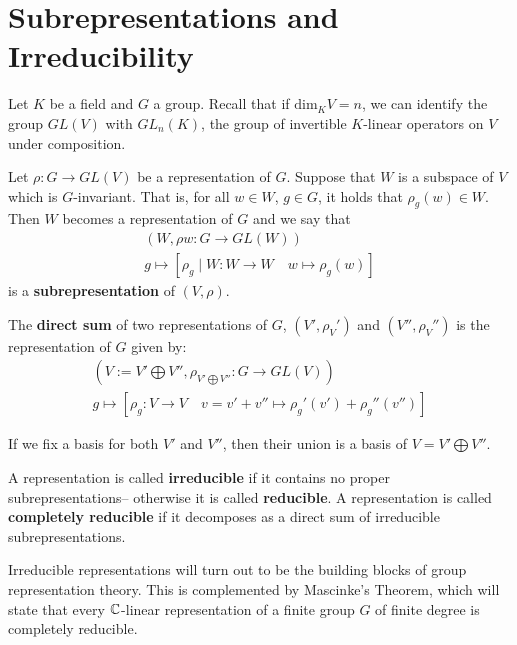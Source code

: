 \documentclass{memoir}
\begin{document}


\section{Subrepresentations and Irreducibility}
\label{sec:subrepresentations_and_irreducibility}

Let \(K\) be a field and \(G\) a group. Recall that if \(\textrm{dim}_KV = n\), we can identify the group \(GL(V)\) with \(GL_n(K)\), the group of invertible \(K \)-linear operators on \(V\) under composition.

\begin{defn}[Subrepresentations]
	Let \(\rho:G\to GL(V)\) be a representation of \(G\). Suppose that \(W\) is a subspace of \(V\) which is \(G\)-invariant. That is, for all \(w \in W\), \(g \in G\), it holds that  \(\rho_g(w)\in W\). Then \(W\) becomes a representation of \(G\) and we say that
	\begin{align*}
		(W,\rho w:G\to GL(W))\\
		g\mapsto \left[ \rho_g\mid W:W\to W \quad w \mapsto \rho_g(w) \right] 
	\end{align*}
	is a \textbf{subrepresentation} of \((V,\rho)\).
\end{defn}


\begin{defn}
	The \textbf{direct sum} of two representations of \(G\), \((V',\rho_V')\) and \((V'',\rho_V'')\) is the representation of \(G\) given by:
	\begin{align*}
		(V:=V'\bigoplus V'', \rho_{V'\bigoplus V''}:G \to GL(V) )\\
		g\mapsto \left[ \rho_g:V\to V \quad v = v'+v''\mapsto \rho_g'(v') + \rho_g''(v'') \right] 
	\end{align*}
\end{defn}
If we fix a basis for both \(V'\) and \(V''\), then their union is a basis of \(V = V'\bigoplus V''\).


\begin{defn}[Irreducible]
	A representation is called \textbf{irreducible} if it contains no proper subrepresentations-- otherwise it is called \textbf{reducible}. A representation is called \textbf{completely reducible} if it decomposes as a direct sum of irreducible subrepresentations.
\end{defn}
Irreducible representations will turn out to be the building blocks of group representation theory. This is complemented by Mascinke's Theorem, which will state that every \(\mathbb{C}\)-linear representation of a finite group \(G\) of finite degree is completely reducible.

\end{document}
